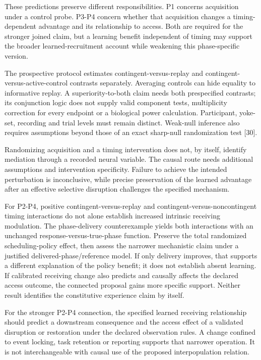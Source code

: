 \documentclass[
  american,
  11pt,
  letterpaper,
]{article}
\begin{document}
These predictions preserve different responsibilities. P1 concerns acquisition under a control probe. P3-P4 concern whether that acquisition changes a timing-dependent advantage and its relationship to access. Both are required for the stronger joined claim, but a learning benefit independent of timing may support the broader learned-recruitment account while weakening this phase-specific version.

The prospective protocol estimates contingent-versus-replay and contingent-versus-active-control contrasts separately. Averaging controls can hide equality to informative replay. A superiority-to-both claim needs both prespecified contrasts; its conjunction logic does not supply valid component tests, multiplicity correction for every endpoint or a biological power calculation. Participant, yoke-set, recording and trial levels must remain distinct. Weak-null inference also requires assumptions beyond those of an exact sharp-null randomization test {[}30{]}.

Randomizing acquisition and a timing intervention does not, by itself, identify mediation through a recorded neural variable. The causal route needs additional assumptions and intervention specificity. Failure to achieve the intended perturbation is inconclusive, while precise preservation of the learned advantage after an effective selective disruption challenges the specified mechanism.

For P2-P4, positive contingent-versus-replay and contingent-versus-noncontingent timing interactions do not alone establish increased intrinsic receiving modulation. The phase-delivery counterexample yields both interactions with an unchanged response-versus-true-phase function. Preserve the total randomized scheduling-policy effect, then assess the narrower mechanistic claim under a justified delivered-phase/reference model. If only delivery improves, that supports a different explanation of the policy benefit; it does not establish absent learning. If calibrated receiving change also predicts and causally affects the declared access outcome, the connected proposal gains more specific support. Neither result identifies the constitutive experience claim by itself.

For the stronger P2-P4 connection, the specified learned receiving relationship should predict a downstream consequence and the access effect of a validated disruption or restoration under the declared observation rules. A change confined to event locking, task retention or reporting supports that narrower operation. It is not interchangeable with causal use of the proposed interpopulation relation.
\end{document}
